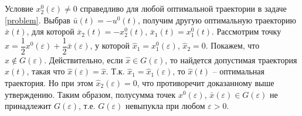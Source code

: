 \documentclass[../main.tex]{subfiles}
\begin{document}
Условие $ x_2^0(\varepsilon) \neq 0 $ справедливо для любой оптимальной траектории в задаче \eqref{problem}. Выбрав $ \bar{u}(t) = -u^0(t) $, получим другую оптимальную траекторию $ \bar{x}(t) $, для которой $ \bar{x}_2(t) = -x_2^0(t) $, $ \bar{x}_1(t) = x_1^0(t) $.
Рассмотрим точку $ \hat{x} = \dfrac{1}{2}x^0(\varepsilon) + \dfrac{1}{2}\bar{x}(\varepsilon) $, у которой $ \hat{x}_1 = x_1^0(\varepsilon) $, $ \hat{x}_2 = 0 $. Покажем, что $ \hat{x} \notin G(\varepsilon) $. Действительно, если $ \hat{x} \in G(\varepsilon) $, то найдется допустимая траектория $ \hat{x}(t) $, такая что $ \hat{x}(\varepsilon) = \hat{x} $. Т.к. $ \hat{x}_1 = \hat{x}_1(\varepsilon) $, то $  \hat{x}(t) $ -- оптимальная траектория. Но при этом $ \hat{x}_2(\varepsilon) = 0 $, что противоречит доказанному выше утверждению. Таким образом, полусумма точек $ x^0(\varepsilon) $, $ \bar{x}(\varepsilon) \in G(\varepsilon) $ не принадлежит $ G(\varepsilon) $, т.е. $ G(\varepsilon) $ невыпукла при любом $ \varepsilon > 0 $.




 
\end{document}
